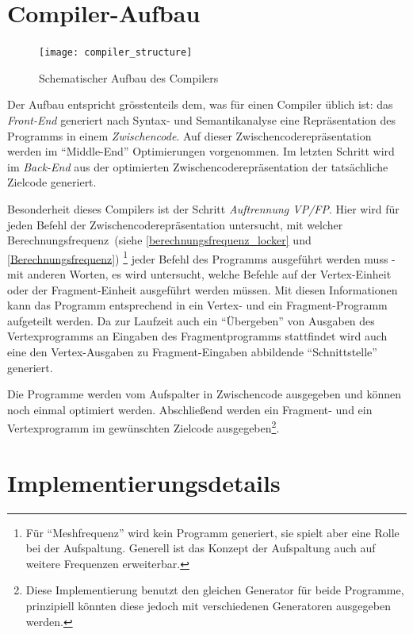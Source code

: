 \documentclass[twoside,a4paper,fleqn,12pt]{book}
\begin{document}
\section{Compiler-Aufbau}
\begin{figure}[h]
   \centering
  \texttt{[image: compiler\_structure]}
  \caption{Schematischer Aufbau des Compilers}
  \label{fig:structure}
\end{figure}

Der Aufbau entspricht grösstenteils dem, was für einen Compiler üblich ist: das \emph{Front-End} generiert nach Syntax- und Semantikanalyse
eine Repräsentation des Programms in einem \emph{Zwischencode}. Auf dieser Zwischencoderepräsentation werden im "`Middle-End"' %
Optimierungen vorgenommen. Im letzten Schritt wird im \emph{Back-End} aus der optimierten Zwischencoderepräsentation der tatsächliche Zielcode generiert.

Besonderheit dieses Compilers ist der Schritt \emph{Auftrennung VP/FP}. Hier wird für jeden Befehl der Zwischencoderepräsentation untersucht, mit
welcher Berechnungsfrequenz~(siehe \ref{berechnungsfrequenz_locker} und \ref{Berechnungsfrequenz})
\footnote{Für "`Meshfrequenz"' wird kein Programm generiert, sie spielt aber eine Rolle bei der Aufspaltung. Generell ist das Konzept der Aufspaltung auch auf weitere Frequenzen erweiterbar.}
jeder Befehl des Programms ausgeführt werden muss - mit anderen Worten,
es wird untersucht, welche Befehle auf der Vertex-Einheit oder der Fragment-Einheit ausgeführt werden müssen. Mit diesen Informationen kann
das Programm entsprechend in ein Vertex- und ein Fragment-Programm aufgeteilt werden. Da zur Laufzeit auch ein "`Übergeben"' von Ausgaben
des Vertexprogramms an Eingaben des Fragmentprogramms stattfindet wird auch eine den Vertex-Ausgaben zu Fragment-Eingaben
abbildende "`Schnittstelle"' generiert.

Die Programme werden vom Aufspalter in Zwischencode ausgegeben und können noch einmal optimiert werden. %
Abschließend werden ein Fragment- und ein Vertexprogramm im gewünschten Zielcode ausgegeben\footnote{Diese Implementierung benutzt den
gleichen Generator für beide Programme, prinzipiell könnten diese jedoch mit verschiedenen Generatoren ausgegeben werden.}.

\section{Implementierungsdetails}
\end{document}
